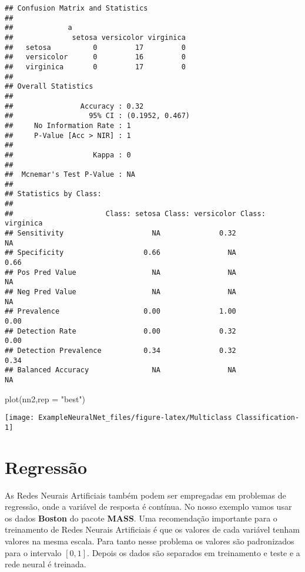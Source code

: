 \documentclass[
]{article}
\newenvironment{Shaded}{\begin{snugshade}}{\end{snugshade}}
\newcommand{\AttributeTok}[1]{\textcolor[rgb]{0.77,0.63,0.00}{#1}}
\newcommand{\FunctionTok}[1]{\textcolor[rgb]{0.00,0.00,0.00}{#1}}
\newcommand{\NormalTok}[1]{#1}
\newcommand{\StringTok}[1]{\textcolor[rgb]{0.31,0.60,0.02}{#1}}
\begin{document}
\begin{verbatim}
## Confusion Matrix and Statistics
## 
##             a
##              setosa versicolor virginica
##   setosa          0         17         0
##   versicolor      0         16         0
##   virginica       0         17         0
## 
## Overall Statistics
##                                          
##                Accuracy : 0.32           
##                  95% CI : (0.1952, 0.467)
##     No Information Rate : 1              
##     P-Value [Acc > NIR] : 1              
##                                          
##                   Kappa : 0              
##                                          
##  Mcnemar's Test P-Value : NA             
## 
## Statistics by Class:
## 
##                      Class: setosa Class: versicolor Class: virginica
## Sensitivity                     NA              0.32               NA
## Specificity                   0.66                NA             0.66
## Pos Pred Value                  NA                NA               NA
## Neg Pred Value                  NA                NA               NA
## Prevalence                    0.00              1.00             0.00
## Detection Rate                0.00              0.32             0.00
## Detection Prevalence          0.34              0.32             0.34
## Balanced Accuracy               NA                NA               NA
\end{verbatim}

\begin{Shaded}
\begin{Highlighting}[]
\FunctionTok{plot}\NormalTok{(nn2,}\AttributeTok{rep =} \StringTok{"best"}\NormalTok{)}
\end{Highlighting}
\end{Shaded}

\begin{center}\texttt{[image: ExampleNeuralNet\_files/figure-latex/Multiclass Classification-1]} \end{center}

\hypertarget{regressuxe3o}{%
\section{Regressão}\label{regressuxe3o}}

As Redes Neurais Artificiais também podem ser empregadas em problemas de
regressão, onde a variável de resposta é contínua. No nosso exemplo
vamos usar os dados \textbf{Boston} do pacote \textbf{MASS}. Uma
recomendação importante para o treinamento de Redes Neurais Artificiais
é que os valores de cada variável tenham valores na mesma escala. Para
tanto nesse problema os valores são padronizados para o intervalo
\([0,1]\). Depois os dados são separados em treinamento e teste e a rede
neural é treinada.
\end{document}
